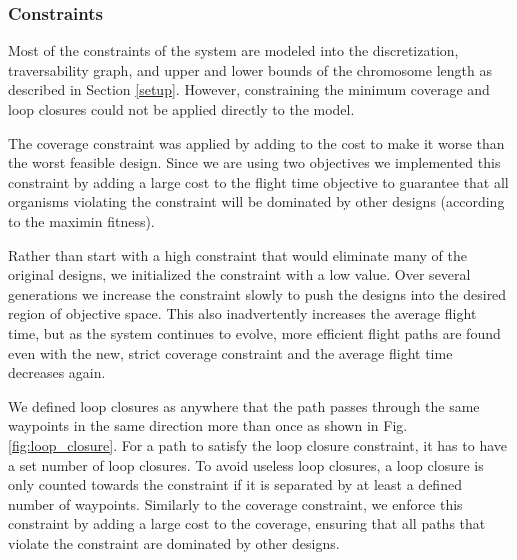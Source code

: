 \documentclass[letterpaper, 10 pt, conference]{ieeeconf}  %
\begin{document}
\subsubsection{Constraints}\label{constraints}

Most of the constraints of the system are modeled into the discretization, traversability graph, and upper and lower bounds of the chromosome length as described in Section \ref{setup}. However, constraining the minimum coverage and loop closures could not be applied directly to the model.

The coverage constraint was applied by adding to the cost to make it worse than the worst feasible design. Since we are using two objectives we implemented this constraint by adding a large cost to the flight time objective to guarantee that all organisms violating the constraint will be dominated by other designs (according to the maximin fitness).

Rather than start with a high constraint that would eliminate many of the original designs, we initialized the constraint with a low value. Over several generations we increase the constraint slowly to push the designs into the desired region of objective space. This also inadvertently increases the average flight time, but as the system continues to evolve, more efficient flight paths are found even with the new, strict coverage constraint and the average flight time decreases again.

We defined loop closures as anywhere that the path passes through the same waypoints in the same direction more than once as shown in Fig. \ref{fig:loop_closure}. For a path to satisfy the loop closure constraint, it has to have a set number of loop closures. To avoid useless loop closures, a loop closure is only counted towards the constraint if it is separated by at least a defined number of waypoints. Similarly to the coverage constraint, we enforce this constraint by adding a large cost to the coverage, ensuring that all paths that violate the constraint are dominated by other designs.
\end{document}
